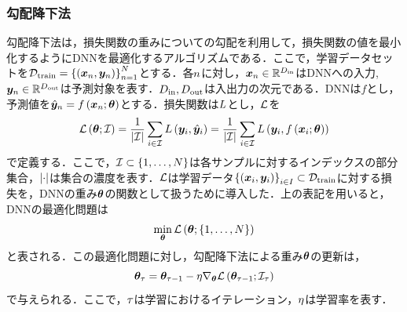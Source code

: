 \subsubsection{勾配降下法}
\label{sec3:sec:gradient_descent}
勾配降下法は，損失関数の重みについての勾配を利用して，損失関数の値を最小化するようにDNNを最適化するアルゴリズムである．ここで，学習データセットを$\mathcal{D}_{\text{train}} = \left\{\left(\bm{x}_{n}, \bm{y}_{n}\right)\right\}_{n = 1}^{N}$とする．各$n$に対し，$\bm{x}_{n} \in \mathbb{R}^{D_{\text{in}}}$はDNNへの入力, $\bm{y}_{n} \in \mathbb{R}^{D_{\text{out}}}$は予測対象を表す．$D_{\text{in}}, D_{\text{out}}$は入出力の次元である．DNNは$f$とし，予測値を$\hat{\bm{y}}_{n} = f\left(\bm{x}_{n}; \bm{\theta}\right)$とする．損失関数は$L$とし，$\mathcal{L}$を
\begin{equation}
    \mathcal{L}\left(\bm{\theta}; \mathcal{I}\right) = \frac{1}{\left|\mathcal{I}\right|} \sum_{i \in \mathcal{I}} L\left(\bm{y}_{i}, \hat{\bm{y}}_{i}\right) = \frac{1}{\left|\mathcal{I}\right|} \sum_{i \in \mathcal{I}} L\left(\bm{y}_{i}, f\left(\bm{x}_{i}; \bm{\theta}\right)\right)
\end{equation}
で定義する．ここで，$\mathcal{I} \subset \left\{1, \ldots, N\right\}$は各サンプルに対するインデックスの部分集合，$\left|\cdot\right|$は集合の濃度を表す．$\mathcal{L}$は学習データ$\left\{\left(\bm{x}_{i}, \bm{y}_{i}\right)\right\}_{i \in I} \subset \mathcal{D}_{\text{train}}$に対する損失を，DNNの重み$\bm{\theta}$の関数として扱うために導入した．上の表記を用いると，DNNの最適化問題は
\begin{equation}
    \min_{\bm{\theta}} \mathcal{L}\left(\bm{\theta}; \left\{1, \ldots, N\right\}\right)
\end{equation}
と表される．この最適化問題に対し，勾配降下法による重み$\bm{\theta}$の更新は，
\begin{equation}
    \label{sec3:eq:normal_gradient_descent}
    \bm{\theta}_{\tau} = \bm{\theta}_{\tau - 1} - \eta \nabla_{\bm{\theta}} \mathcal{L}\left(\bm{\theta}_{\tau - 1}; \mathcal{I}_{\tau}\right)
\end{equation}
で与えられる．ここで，$\tau$は学習におけるイテレーション，$\eta$は学習率を表す．

